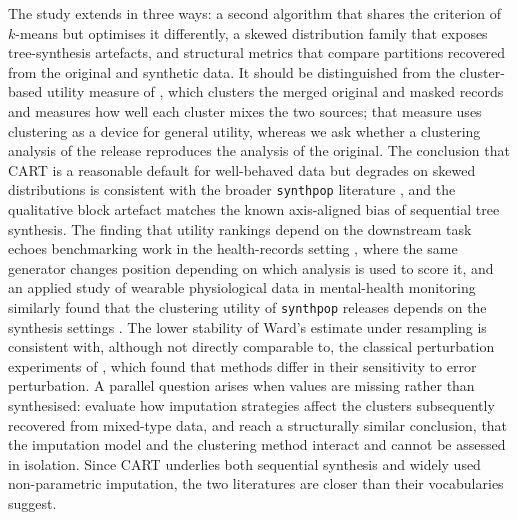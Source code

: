 \documentclass[pdflatex,referee]{sn-jnl}
\begin{document}
The study extends \citet{chen2025} in three ways: a second algorithm that
shares the criterion of $k$-means but optimises it differently, a skewed
distribution family that exposes tree-synthesis artefacts, and structural
metrics that compare partitions recovered from the original and synthetic
data. It should be distinguished from the cluster-based utility measure of
\citet{woo2009}, which clusters the merged original and masked records and
measures how well each cluster mixes the two sources; that measure uses
clustering as a device for general utility, whereas we ask whether a
clustering analysis of the release reproduces the analysis of the original.
The conclusion that CART is a reasonable default for well-behaved data but
degrades on skewed distributions is consistent with the broader
\texttt{synthpop} literature \citep{nowok2016,snoke2018}, and the qualitative
block artefact matches the known axis-aligned bias of sequential tree
synthesis. The finding that utility rankings depend on the downstream task
echoes benchmarking work in the health-records setting
\citep{yan2022,elemam2022}, where the same generator changes position depending
on which analysis is used to score it, and an applied study of wearable
physiological data in mental-health monitoring similarly found that the
clustering utility of \texttt{synthpop} releases depends on the synthesis
settings \citep{vidiella2025}. The lower stability of Ward's estimate under
resampling is consistent with, although not directly comparable to, the
classical perturbation experiments of \citet{milligan1980}, which found that
methods differ in their sensitivity to error perturbation. A parallel question
arises when values are missing rather than synthesised: \citet{aschenbruck2023}
evaluate how imputation strategies affect the clusters subsequently recovered
from mixed-type data, and reach a structurally similar conclusion, that the
imputation model and the clustering method interact and cannot be assessed in
isolation. Since CART underlies both sequential synthesis and widely used
non-parametric imputation, the two literatures are closer than their
vocabularies suggest.
\end{document}
